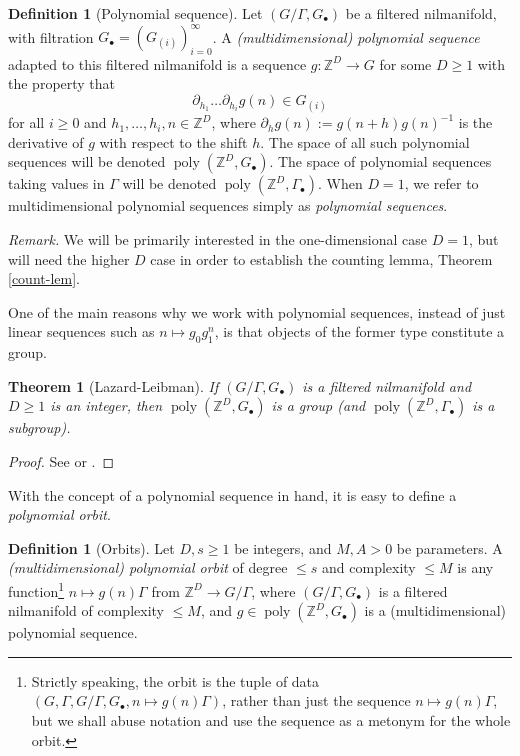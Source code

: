 \documentclass[11pt,reqno]{amsart}
\numberwithin{equation}{section}
\theoremstyle{plain}
\newtheorem{theorem}[subsection]{Theorem}
\theoremstyle{definition}
\newtheorem{definition}[subsection]{Definition}
\renewcommand{\leq}{\leqslant}
\renewcommand{\geq}{\geqslant}
\newcommand\Z{\mathbb{Z}}
\newcommand\1{{\bf 1}}
\newcommand\2{{\bf 2}}
\newcommand\poly{\operatorname{poly}}
\begin{document}
\begin{definition}[Polynomial sequence]  Let $(G/\Gamma,G_\bullet)$ be a filtered nilmanifold, with filtration $G_\bullet = (G_{(i)})_{i=0}^\infty$.  A \emph{\textup{(}multidimensional\textup{)} polynomial sequence} adapted to this filtered nilmanifold is a sequence $g: \Z^D \to G$ for some $D \geq 1$ with the property that 
$$ \partial_{h_1} \ldots \partial_{h_i} g(n) \in G_{(i)}$$
for all $i \geq 0$ and $h_1,\ldots,h_i,n \in \Z^D$, where $\partial_h g(n) := g(n+h) g(n)^{-1}$ is the derivative of $g$ with respect to the shift $h$.  The space of all such polynomial sequences will be denoted $\poly(\Z^D, G_\bullet)$.  The space of polynomial sequences taking values in $\Gamma$ will be denoted $\poly(\Z^D, \Gamma_\bullet)$.  When $D=1$, we refer to multidimensional polynomial sequences simply as \emph{polynomial sequences}.
\end{definition}

\emph{Remark.} We will be primarily interested in the one-dimensional case $D=1$, but will need the higher $D$ case in order to establish the counting lemma, Theorem \ref{count-lem}.

One of the main reasons why we work with polynomial sequences, instead of just linear sequences such as $n \mapsto g_0 g_1^n$, is that objects of the former type constitute a group.

\begin{theorem}[Lazard-Leibman]\label{ll-thm}  If $(G/\Gamma,G_\bullet)$ is a filtered nilmanifold and $D \geq 1$ is an integer, then $\poly(\Z^D,G_\bullet)$ is a group \textup{(}and $\poly(\Z^D,\Gamma_\bullet)$ is a subgroup\textup{)}.
\end{theorem}

\begin{proof} See \cite{leibman-group-2} or \cite[Proposition 6.2]{green-tao-nilratner}.  
\end{proof}

With the concept of a polynomial sequence in hand, it is easy to define a \emph{polynomial orbit}.

\begin{definition}[Orbits]  Let $D, s \geq 1$ be integers, and $M, A > 0$ be parameters.  A  \emph{\textup{(}multidimensional\textup{)} polynomial orbit} of degree $\leq s$ and complexity $\leq M$ is any function\footnote{Strictly speaking, the orbit is the tuple of data $(G, \Gamma, G/\Gamma, G_\bullet, n \mapsto g(n)\Gamma)$, rather than just the sequence $n \mapsto g(n) \Gamma$, but we shall abuse notation and use the sequence as a metonym for the whole orbit.} $n \mapsto g(n) \Gamma$ from $\Z^D \to G/\Gamma$, where $(G/\Gamma,G_\bullet)$ is a filtered nilmanifold of complexity $\leq M$, and $g \in \poly(\Z^D, G_\bullet)$ is a \textup{(}multidimensional\textup{)} polynomial sequence.  
\end{definition}
\end{document}
